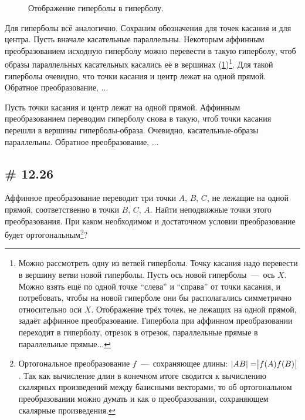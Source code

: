 \documentclass[a4paper,12pt]{article}
\begin{document}
\begin{solution}
\begin{figure}
      \caption{Отображение гиперболы в гиперболу.}
      \label{fig:hyperbola-new-hyperbola}
    \end{figure}

    Для гиперболы всё аналогично.
    Сохраним обозначения для точек касания и для центра.
    Пусть вначале касательные параллельны.
    Некоторым аффинным преобразованием исходную гиперболу можно перевести в такую гиперболу, чтоб образы параллельных касательных касались её в вершинах (\ref{fig:hyperbola-new-hyperbola})\footnote{Можно рассмотреть одну из ветвей гиперболы. Точку касания надо перевести в вершину ветви новой гиперболы. Пусть ось новой гиперболы~---~ось $X$. Можно взять ещё по одной точке ``слева'' и ``справа'' от точки касания, и потребовать, чтобы на новой гиперболе они бы располагались симметрично относительно оси $X$. Отображение трёх точек, не лежащих на одной прямой, задаёт аффинное преобразование. Гипербола при аффинном преобразовании переходит в гиперболу, отрезок в отрезок, параллельные прямые в параллельные прямые...}.
    Для такой гиперболы очевидно, что точки касания и центр лежат на одной прямой.
    Обратное преобразование, ...
    
    Пусть точки касания и центр лежат на одной прямой.
    Аффинным преобразованием переводим гиперболу снова в такую, чтоб точки касания перешли в вершины гиперболы-образа.
    Очевидно, касательные-образы параллельны.
    Обратное преобразование, ...
  \end{solution}
  
  
  \subsection{\# 12.26}
  
  Аффинное преобразование переводит три точки $A$, $B$, $C$, не лежащие на одной прямой, соответственно в точки $B$, $C$, $A$.
  Найти неподвижные точки этого преобразования.
  При каком необходимом и достаточном условии преобразование будет ортогональным\footnote{Ортогональное преобразование $f$~---~сохраняющее длины: $|AB| \hm= \bigr|f(A)f(B)\bigl|$. Так как вычисление длин в конечном итоге сводится к вычислению скалярных произведений между базисными векторами, то об ортогональном преобразовании можно думать и как о преобразовании, сохраняющем скалярные произведения.}?
  
\end{document}
